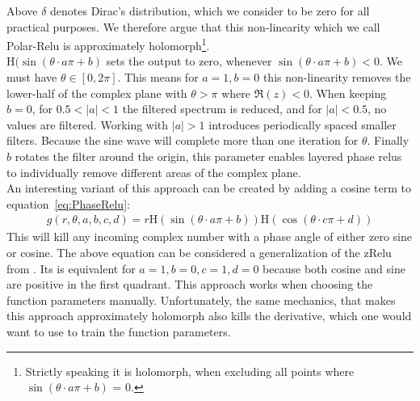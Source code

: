 \documentclass{article}
\begin{document}
Above $\delta$ denotes Dirac's distribution, which we consider to be zero for all practical purposes. 
We therefore argue that this non-linearity which we call Polar-Relu is approximately holomorph\footnote{Strictly speaking it is holomorph, when excluding all points where $\sin (\theta \cdot a\pi + b)$ = 0.}.\\
$\text{H}(\sin(\theta \cdot a \pi + b)$ sets the output to zero, whenever $\sin (\theta \cdot a\pi + b) < 0$. We must have $\theta \in [0, 2\pi]$. This means for $a = 1, b = 0$ this non-linearity removes the lower-half of the complex plane with $\theta > \pi$ where $\Re(z) < 0$. When keeping $b=0$, for $0.5 < |a| < 1$ the filtered spectrum is reduced, and for $|a| < 0.5$, no values are filtered. Working with $|a| > 1$ introduces periodically spaced smaller filters. Because the sine wave will complete more than one iteration for $\theta$. Finally $b$ rotates the filter around the origin, this parameter enables layered phase relus to individually remove different areas of the complex plane. \\
An interesting variant of this approach can be created by adding a cosine term to equation~\ref{eq:PhaseRelu}:
\begin{align}
g(r,\theta,a,b,c,d) = r \text{H}(\sin (\theta \cdot a\pi + b))\text{H}(\cos (\theta \cdot c\pi + d))
\end{align}
This will kill any incoming complex number with a phase angle of either zero sine or cosine. The above equation can be considered a generalization of the zRelu from \cite{Guberman}\cite{Trabelsi}. Its is equivalent for $a=1, b=0, c=1, d=0$ because both cosine and sine are positive in the first quadrant. This approach works when choosing the function parameters manually. Unfortunately, the same mechanics, that makes this approach approximately holomorph also kills the derivative, which one would want to use to train the function parameters.  \\
\end{document}
